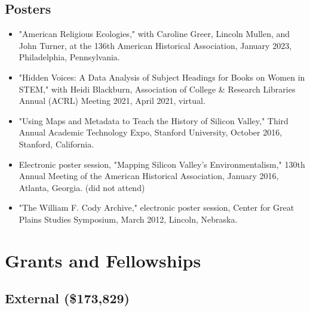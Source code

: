 \documentclass[10pt]{article}
\begin{document}
\subsection*{Posters}

\begin{itemize}
  \item "American Religious Ecologies," with Caroline Greer, Lincoln Mullen, and John Turner, at the 136th American Historical Association, January 2023, Philadelphia, Pennsylvania.
  
  \item "Hidden Voices: A Data Analysis of Subject Headings for Books on Women in STEM," with Heidi Blackburn, Association of College \& Research Libraries Annual (ACRL) Meeting 2021, April 2021, virtual.
  
  \item "Using Maps and Metadata to Teach the History of Silicon Valley," Third Annual Academic Technology Expo, Stanford University, October 2016, Stanford, California.
  
  \item Electronic poster session, "Mapping Silicon Valley's Environmentalism," 130th Annual Meeting of the American Historical Association, January 2016, Atlanta, Georgia. (did not attend)
  
  \item "The William F. Cody Archive," electronic poster session, Center for Great Plains Studies Symposium, March 2012, Lincoln, Nebraska.
\end{itemize}

\section{Grants and Fellowships}

\subsection*{External (\$173,829)}
\end{document}
